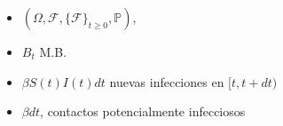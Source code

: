 \begin{frame}
\begin{textblock*}{60mm}
{\begin{itemize}
                \item<3-6>
                    $
                        (
                            \Omega,
                            \mathcal{F},
                            \{\mathcal{F}\}_{t \geq 0},
                            \mathbb{P}
                        )
                   $,
                \item<4-6>
                    $B_t$ M.B.
                \item<5-6>
                    $\beta S(t)I(t) dt$ nuevas infecciones en $[t,t+dt)$
                \item<6>
                    $\beta dt$, contactos potencialmente infecciosos
            \end{itemize}
        }
    \end{textblock*}
\end{frame}